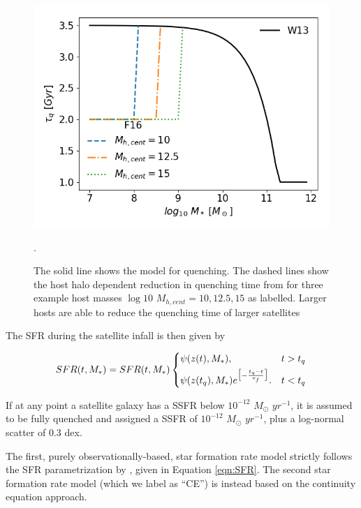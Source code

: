 \begin{figure}
	\centering
	\includegraphics[width = \linewidth]{Figures/Chapter3/Fig4.png}
	\caption{The solid line shows the \citet[][W13]{Wetzel2013GalaxyUniverse} model for quenching. The dashed lines show the host halo dependent reduction in quenching time from \citet[][F16]{Fillingham2016UnderStripping} for three example host masses $\log10$ $M_{h, cent} = 10, 12.5, 15$ as labelled. Larger hosts are able to reduce the quenching time of larger satellites}.
	\label{fig:QuenchFig}
\end{figure}

The SFR during the satellite infall is then given by

\begin{equation}
\label{eqn:SFR_Quench}
SFR(t, M_*) = SFR(t, M_*)
\begin{dcases}
\psi(z(t), M_*), & \text{} t > t_q \\
\psi(z(t_q), M_*)e^{\big[-\frac{t_q-t}{\tau_f}\big]}. & \text{} t < t_q
\end{dcases}
\end{equation}

If at any point a satellite galaxy has a SSFR below $10^{-12}$ $M_{\odot}$ $yr^{-1}$, it is assumed to be fully quenched and assigned a SSFR of $10^{-12}$ $M_{\odot}$ $yr^{-1}$, plus a log-normal scatter of 0.3 dex.


The first, purely observationally-based, star formation rate model strictly follows the SFR parametrization by \citet[][T16 hereafter]{Tomczak2016THE4}, given in Equation \ref{eqn:SFR}. The second star formation rate model (which we label as ``CE'') is instead based on the continuity equation approach. 

